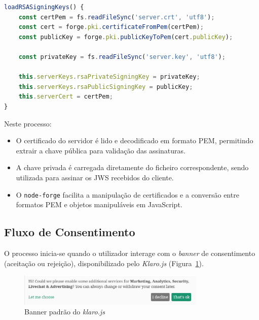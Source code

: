 \begin{lstlisting}[language=Javascript, caption={Carregamento das chaves RSA do servidor e do certificado associado}, label={lst:server-rsa-key-load}]
loadRSASigningKeys() {
	const certPem = fs.readFileSync('server.crt', 'utf8');
	const cert = forge.pki.certificateFromPem(certPem);
	const publicKey = forge.pki.publicKeyToPem(cert.publicKey);

	const privateKey = fs.readFileSync('server.key', 'utf8');

	this.serverKeys.rsaPrivateSigningKey = privateKey;
	this.serverKeys.rsaPublicSigningKey = publicKey;
	this.serverCert = certPem;
}
\end{lstlisting}

Neste processo:
\begin{itemize}
    \item O certificado do servidor é lido e decodificado em formato PEM, permitindo extrair a chave pública para validação das assinaturas.
    \item A chave privada é carregada diretamente do ficheiro correspondente, sendo utilizada para assinar os JWS recebidos do cliente.
    \item O \texttt{node-forge} facilita a manipulação de certificados e a conversão entre formatos PEM e objetos manipuláveis em JavaScript.
\end{itemize}

\subsection{Fluxo de Consentimento}

O processo inicia-se quando o utilizador interage com o \textit{banner} de consentimento (aceitação ou rejeição), disponibilizado pelo \textit{Klaro.js} (Figura~\ref{fig:klarojs-banner}).

\begin{figure}[h]
    \centering
	\includegraphics[width=0.8\textwidth]{images/klaro_banner.png}
	\caption{Banner padrão do \textit{klaro.js}}
\label{fig:klarojs-banner}
\end{figure}

